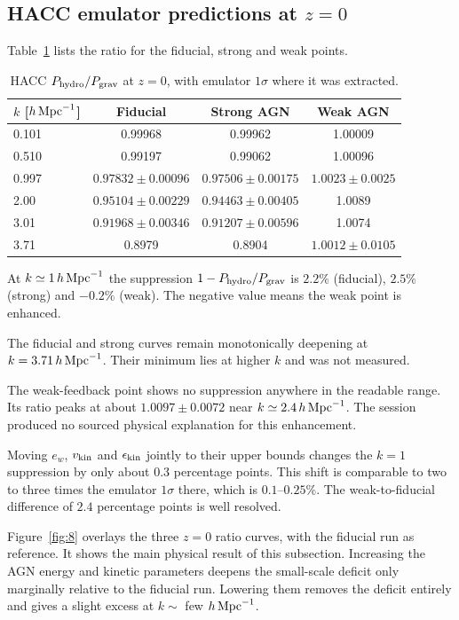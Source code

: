 \documentclass[11pt,a4paper]{article}
\begin{document}
\subsection{HACC emulator predictions at $z=0$}

Table~\ref{tab:three} lists the ratio for the fiducial, strong and weak points.

\begin{table}
\centering
\begin{tabular}{lccc}
\toprule
$k$ [$h\,{\rm Mpc}^{-1}$] & Fiducial & Strong AGN & Weak AGN\\
\midrule
0.101 & 0.99968 & 0.99962 & 1.00009\\
0.510 & 0.99197 & 0.99062 & 1.00096\\
0.997 & $0.97832\pm0.00096$ & $0.97506\pm0.00175$ & $1.0023\pm0.0025$\\
2.00 & $0.95104\pm0.00229$ & $0.94463\pm0.00405$ & 1.0089\\
3.01 & $0.91968\pm0.00346$ & $0.91207\pm0.00596$ & 1.0074\\
3.71 & 0.8979 & 0.8904 & $1.0012\pm0.0105$\\
\bottomrule
\end{tabular}
\caption{HACC $P_{\rm hydro}/P_{\rm grav}$ at $z=0$, with emulator $1\sigma$ where it was extracted.}
\label{tab:three}
\end{table}

At $k\simeq1\,h\,{\rm Mpc}^{-1}$ the suppression $1-P_{\rm hydro}/P_{\rm grav}$ is $2.2\%$ (fiducial), $2.5\%$ (strong) and $-0.2\%$ (weak). The negative value means the weak point is enhanced.

The fiducial and strong curves remain monotonically deepening at $k=3.71\,h\,{\rm Mpc}^{-1}$. Their minimum lies at higher $k$ and was not measured.

The weak-feedback point shows no suppression anywhere in the readable range. Its ratio peaks at about $1.0097\pm0.0072$ near $k\simeq2.4\,h\,{\rm Mpc}^{-1}$. The session produced no sourced physical explanation for this enhancement.

Moving $e_w$, $v_{\rm kin}$ and $\epsilon_{\rm kin}$ jointly to their upper bounds changes the $k=1$ suppression by only about $0.3$ percentage points. This shift is comparable to two to three times the emulator $1\sigma$ there, which is $0.1$--$0.25\%$. The weak-to-fiducial difference of $2.4$ percentage points is well resolved.

Figure~\ref{fig:8} overlays the three $z=0$ ratio curves, with the fiducial run as reference. It shows the main physical result of this subsection. Increasing the AGN energy and kinetic parameters deepens the small-scale deficit only marginally relative to the fiducial run. Lowering them removes the deficit entirely and gives a slight excess at $k\sim$ few $h\,{\rm Mpc}^{-1}$.
\end{document}
